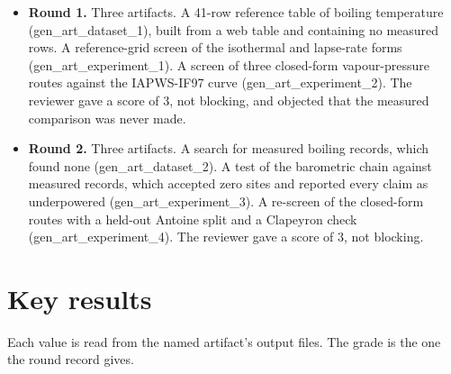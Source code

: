 \documentclass[11pt,letterpaper]{article}
\begin{document}
\begin{itemize}
\item \textbf{Round 1.} Three artifacts. A 41-row reference table of boiling temperature (gen\_art\_\allowbreak{}dataset\_1), built from a web table and containing no measured rows. A reference-grid screen of the isothermal and lapse-rate forms (gen\_art\_\allowbreak{}experiment\_1). A screen of three closed-form vapour-pressure routes against the IAPWS-IF97 curve (gen\_art\_\allowbreak{}experiment\_2). The reviewer gave a score of 3, not blocking, and objected that the measured comparison was never made.
\item \textbf{Round 2.} Three artifacts. A search for measured boiling records, which found none (gen\_art\_\allowbreak{}dataset\_2). A test of the barometric chain against measured records, which accepted zero sites and reported every claim as underpowered (gen\_art\_\allowbreak{}experiment\_3). A re-screen of the closed-form routes with a held-out Antoine split and a Clapeyron check (gen\_art\_\allowbreak{}experiment\_4). The reviewer gave a score of 3, not blocking.
\end{itemize}

\section{Key results}

Each value is read from the named artifact's output files. The grade is the one the round record gives.
\end{document}
